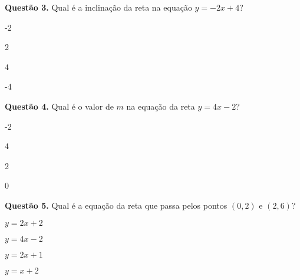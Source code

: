 \documentclass[a4paper,12pt]{article}
\begin{document}
\hspace{-0.4cm} \textbf{Questão 3.} Qual é a inclinação da reta na equação \(y = -2x + 4\)?

\begin{enumerate}[label=\alph*)]
    \begin{multicols}{2}
        \item -2
        \item 2
        \item 4
        \item -4
    \end{multicols}
\end{enumerate}

\vspace{0.5cm}

\hspace{-0.4cm} \textbf{Questão 4.} Qual é o valor de $m$ na equação da reta $y = 4x - 2$?
\begin{enumerate}[label=\alph*)]
    \begin{multicols}{2}
        \item -2
        \item 4
        \item 2
        \item 0
    \end{multicols}
\end{enumerate}

\vspace{0.5cm}

\hspace{-0.4cm} \textbf{Questão 5.} Qual é a equação da reta que passa pelos pontos $(0, 2)$ e $(2, 6)$?

\begin{enumerate}
    \begin{multicols}{2}
        \item $ y = 2x + 2 $
        \item $ y = 4x - 2 $
        \item $ y = 2x + 1 $
        \item $ y = x + 2 $
    \end{multicols}
\end{enumerate}
\end{document}

